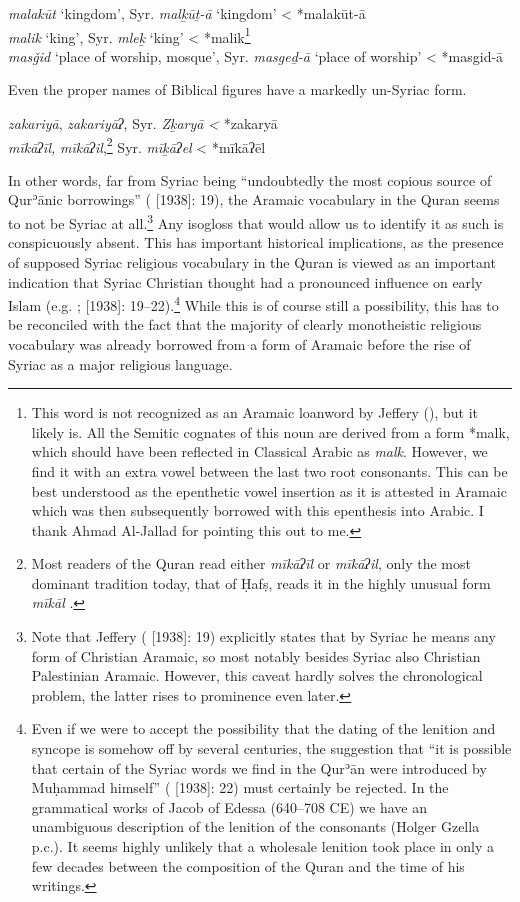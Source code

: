\documentclass[output=paper]{langsci/langscibook}
\begin{document}
\ea
\ea\textit{malakūt} ‘kingdom’, Syr. \textit{malḵūṯ-ā} ‘kingdom’ < *malakūt-ā\\
\ex\textit{malik} ‘king’, Syr. \textit{mleḵ} ‘king’ < *malik\footnote{This word is not recognized as an Aramaic loanword by Jeffery (\citeyear[270]{Jeffrey2007}), but it likely is. All the Semitic cognates of this noun are derived from a form *malk, which should have been reflected in Classical Arabic as \textit{malk}. However, we find it with an extra vowel between the last two root consonants. This can be best understood as the epenthetic vowel insertion as it is attested in Aramaic which was then subsequently borrowed with this epenthesis into Arabic. I thank Ahmad Al-Jallad for pointing this out to me.}\\
\ex\textit{masǧid} ‘place of worship, mosque’, Syr. \textit{masgeḏ-ā} ‘place of worship’ < *masgid-ā
\z
\z

\noindent Even the proper names of Biblical figures have a markedly un-Syriac form.

\ea
\ea\textit{zakariyā}, \textit{zakariyāʔ}, Syr. \textit{Zḵaryā} \textit{<} *zakaryā\\
\ex\textit{mīkāʔīl,} \textit{mīkāʔil},\footnote{Most readers of the Quran read either \textit{mīkāʔīl} or \textit{mīkāʔil}, only the most dominant tradition today, that of Ḥafṣ, reads it in the highly unusual form \textit{mīkāl} \citep[166]{IbnMujahid}.} Syr. \textit{mīḵāʔel} < *mīkāʔēl
\z
\z

In other words, far from Syriac being “undoubtedly the most copious source of Qurʾānic borrowings” (\citealt{Jeffrey2007} [1938]: 19), the Aramaic vocabulary in the Quran seems to not be Syriac at all.\footnote{Note that Jeffery (\citeyear{Jeffrey2007} [1938]: 19) explicitly states that by Syriac he means any form of Christian Aramaic, so most notably besides Syriac also Christian Palestinian Aramaic. However, this caveat hardly solves the chronological problem, the latter rises to prominence even later.} Any isogloss that would allow us to identify it as such is conspicuously absent. This has important historical implications, as the presence of supposed Syriac religious vocabulary in the Quran is viewed as an important indication that Syriac Christian thought had a pronounced influence on early Islam (e.g. \citealt[82--90]{Mingana1927}; \citealt{Jeffrey2007} [1938]: 19--22).\footnote{Even if we were to accept the possibility that the dating of the lenition and syncope is somehow off by several centuries, the suggestion that “it is possible that certain of the Syriac words we find in the Qurʾān were introduced by Muḥammad himself” (\citealt{Jeffrey2007} [1938]: 22) must certainly be rejected. In the grammatical works of Jacob of Edessa (640–708 CE) we have an unambiguous description of the lenition of the consonants (Holger Gzella p.c.). It seems highly unlikely that a wholesale lenition took place in only a few decades between the composition of the Quran and the time of his writings.} While this is of course still a possibility, this has to be reconciled with the fact that the majority of clearly monotheistic religious vocabulary was already borrowed from a form of Aramaic before the rise of Syriac as a major religious language.
\end{document}
